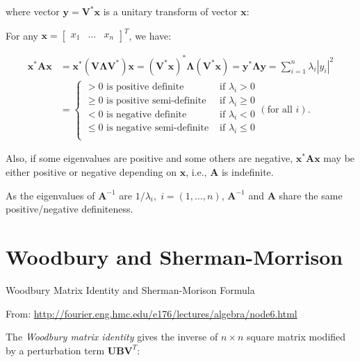 \documentclass[10pt,b5paper,titlepage]{book}
\begin{document}
where vector $\mathbf{y} = \mathbf{V}^{*}\mathbf{x}$ is a unitary transform of
vector $\mathbf{x}$:

For any $\mathbf{x} = \begin{bmatrix} x_1 & \ldots & x_n \end{bmatrix}^{T}$, we have:

\begin{equation}
    \begin{array}{ll}
        \mathbf{x}^{*}\mathbf{A}\mathbf{x}
        &= \mathbf{x}^{*}(\mathbf{V}\mathbf{\Lambda}\mathbf{V}^{*})\mathbf{x}
        = (\mathbf{V}^{*}\mathbf{x})^{*}\mathbf{\Lambda}(\mathbf{V}^{*}\mathbf{x})
        = \mathbf{y}^{*}\mathbf{\Lambda}\mathbf{y}
        = \sum_{i=1}^{n} \lambda_{i} |y_{i}|^{2}\\
        &= \left\{\begin{array}{lr}
                > 0 \text{ is positive definite} & \text{ if } \lambda_{i} > 0\\
                \ge 0 \text{ is positive semi-definite} & \text{ if } \lambda_{i} \ge 0\\
                < 0 \text{ is negative definite} & \text{ if } \lambda_{i} < 0\\
                \le 0 \text{ is negative semi-definite} & \text{ if } \lambda_{i} \le 0\\
        \end{array}  \right. (\text{for all } i).
    \end{array}
\end{equation}

Also, if some eigenvalues are positive and some others are negative,
$\mathbf{x}^{*}\mathbf{A}\mathbf{x}$ may be either positive or negative depending
on $\mathbf{x}$, i.e., $\mathbf{A}$ is indefinite.

As the eigenvalues of $\mathbf{A}^{-1}$ are $1 / \lambda_{i}, \; i = (1, \ldots, n)$,
$\mathbf{A}^{-1}$ and $\mathbf{A}$ share the same positive/negative definiteness.



\chapter{Woodbury and Sherman-Morrison}

Woodbury Matrix Identity and Sherman-Morison Formula

From: \url{http://fourier.eng.hmc.edu/e176/lectures/algebra/node6.html}

The \textit{Woodbury matrix identity} gives the inverse of $n \times n$ square
matrix modified by a perturbation term $\mathbf{U}\mathbf{B}\mathbf{V}^{T}$:
\end{document}
